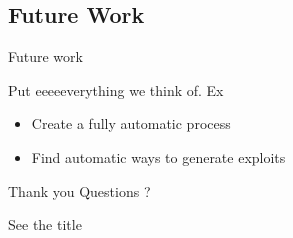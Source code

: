 \documentclass{beamer}
\begin{document}
\subsection{Future Work}
\begin{frame}{Future work}

Put eeeeeverything we think of. Ex
\begin{itemize}
\item Create a fully automatic process
\item Find automatic ways to generate exploits
\end{itemize}

\end{frame}


\begin{frame}{Thank you Questions ?}

See the title

\end{frame}
\end{document}
